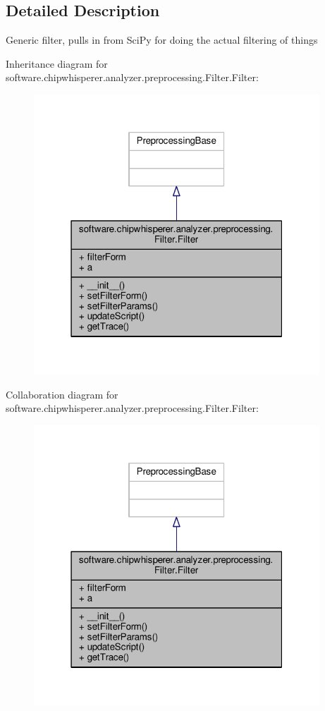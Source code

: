 \subsection{Detailed Description}
\begin{DoxyVerb}Generic filter, pulls in from SciPy for doing the actual filtering of things
\end{DoxyVerb}
 

Inheritance diagram for software.\+chipwhisperer.\+analyzer.\+preprocessing.\+Filter.\+Filter\+:\nopagebreak
\begin{figure}[H]
\begin{center}
\leavevmode
\includegraphics[width=304pt]{da/d94/classsoftware_1_1chipwhisperer_1_1analyzer_1_1preprocessing_1_1Filter_1_1Filter__inherit__graph}
\end{center}
\end{figure}


Collaboration diagram for software.\+chipwhisperer.\+analyzer.\+preprocessing.\+Filter.\+Filter\+:\nopagebreak
\begin{figure}[H]
\begin{center}
\leavevmode
\includegraphics[width=304pt]{dc/d0e/classsoftware_1_1chipwhisperer_1_1analyzer_1_1preprocessing_1_1Filter_1_1Filter__coll__graph}
\end{center}
\end{figure}


